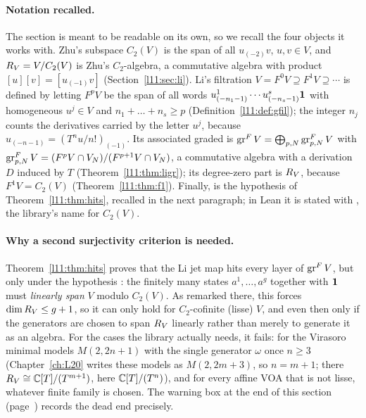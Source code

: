 \paragraph{Notation recalled.} The section is meant to be readable on its own, so we recall the four objects it
works with. Zhu's subspace $C_2(V)$ is the span of all $u_{(-2)}v$, $u,v\in V$, and $R_V = V/C_2(V)$ is
Zhu's $C_2$-algebra, a commutative algebra with product $[u][v] = [u_{(-1)}v]$
(Section~\ref{l11:sec:li}). Li's filtration $V = F^0V\supseteq F^1V\supseteq\cdots$ is defined by letting $F^pV$ be
the span of all words $u^1_{(-n_1-1)}\cdots u^s_{(-n_s-1)}\mathbf{1}$ with homogeneous $u^j\in V$ and $n_1+\dots+n_s\ge p$
(Definition~\ref{l11:def:gfil}); the integer $n_j$ counts the derivatives carried by the letter $u^j$, because
$u_{(-n-1)} = (T^nu/n!)_{(-1)}$. Its associated graded is $\operatorname{gr}^FV = \bigoplus_{p,N}\operatorname{gr}^F_{p,N}V$ with
$\operatorname{gr}^F_{p,N}V = (F^pV\cap V_N)/(F^{p+1}V\cap V_N)$, a commutative algebra with a derivation $D$ induced by $T$
(Theorem~\ref{l11:thm:ligr}); its degree-zero part is $R_V$, because $F^1V = C_2(V)$ (Theorem~\ref{l11:thm:f1}).
Finally,  is the hypothesis of Theorem~\ref{l11:thm:hits}, recalled in the next paragraph; in Lean it is
stated with , the library's name for $C_2(V)$.

\paragraph{Why a second surjectivity criterion is needed.} Theorem~\ref{l11:thm:hits} proves that the Li jet
map hits every layer of $\operatorname{gr}^FV$, but only under the hypothesis : the finitely many states
$a^1,\dots,a^g$ together with $\mathbf{1}$ must \emph{linearly span} $V$ modulo $C_2(V)$. As remarked there,
this forces $\dim R_V\le g+1$, so it can only hold for $C_2$-cofinite (lisse) $V$, and even then only
if the generators are chosen to span $R_V$ linearly rather than merely to generate it as an algebra.
For the cases the library actually needs, it fails: for the Virasoro minimal models $M(2,2n+1)$ with the single
generator $\omega$ once $n\ge3$ (Chapter~\ref{ch:L20} writes these models as $M(2,2m+3)$, so $n=m+1$; there
$R_V\cong{\mathbb{C}}[T]/(T^{m+1})$, here ${\mathbb{C}}[T]/(T^n)$), and for every affine VOA that is not lisse, whatever finite family is chosen. The
warning box at the end of this section (page~\pageref{l11:warn:hdec}) records the dead end precisely.

